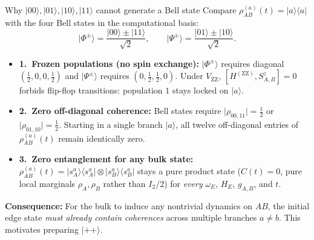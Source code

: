 \documentclass[aspectratio=169,11pt]{beamer}
\newcommand{\ket}[1]{\lvert #1\rangle}
\newcommand{\bra}[1]{\langle #1\rvert}
\newcommand{\ZZ}{\mathrm{ZZ}}
\begin{document}
\begin{frame}{Why $\ket{00},\ket{01},\ket{10},\ket{11}$ cannot generate a Bell state}
\small
Compare $\rho_{AB}^{(a)}(t)=\ket a\bra a$ with the four Bell states in the computational basis:
\[
\ket{\Phi^\pm}=\frac{\ket{00}\pm\ket{11}}{\sqrt2},\qquad
\ket{\Psi^\pm}=\frac{\ket{01}\pm\ket{10}}{\sqrt2}.
\]
\begin{itemize}\setlength\itemsep{6pt}
\item \textbf{1.\ Frozen populations (no spin exchange):}
$\ket{\Phi^\pm}$ requires diagonal $(\tfrac12,0,0,\tfrac12)$ and $\ket{\Psi^\pm}$ requires $(0,\tfrac12,\tfrac12,0)$. Under $V_{\ZZ}$, $[H^{(\ZZ)},S_{A,B}^z]=0$ forbids flip-flop transitions: population $1$ stays locked on $\ket a$.
\item \textbf{2.\ Zero off-diagonal coherence:}
Bell states require $\lvert\rho_{00,11}\rvert=\tfrac12$ or $\lvert\rho_{01,10}\rvert=\tfrac12$. Starting in a single branch $\ket a$, all twelve off-diagonal entries of $\rho_{AB}^{(a)}(t)$ remain identically zero.
\item \textbf{3.\ Zero entanglement for any bulk state:}
$\rho_{AB}^{(a)}(t)=\ket{s_A^a}\bra{s_A^a}\otimes\ket{s_B^a}\bra{s_B^a}$ stays a pure product state ($C(t)=0$, pure local marginals $\rho_A,\rho_B$ rather than $I_2/2$) for \emph{every} $\omega_E$, $H_E$, $g_{A,B}$, and $t$.
\end{itemize}
\medskip
\textbf{Consequence:} For the bulk to induce any nontrivial dynamics on $AB$, the initial edge state \emph{must already contain coherences} across multiple branches $a\ne b$. This motivates preparing $\ket{++}$.
\end{frame}
\end{document}
